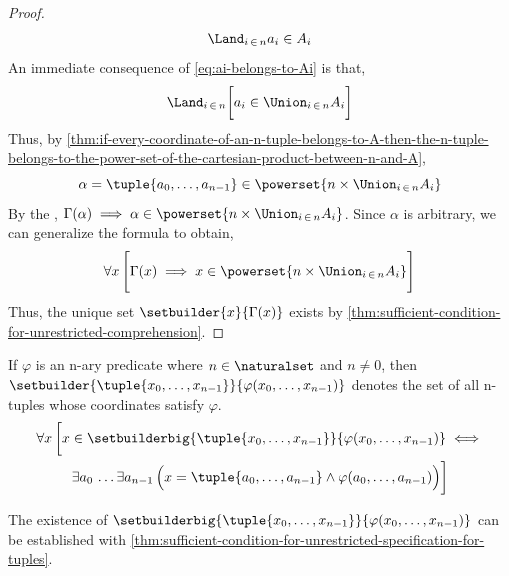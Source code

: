 \begin{proof}
    \begin{equation}
        \label{eq:ai-belongs-to-Ai}
        \Land_{i \,\in\, n} a_{i} \in A_{i}
    \end{equation}
    An immediate consequence of \eqref{eq:ai-belongs-to-Ai} is that,
    \begin{equation*}
        \Land_{i \,\in\, n} \bigg[a_{i} \in \Union_{i \,\in\, n} A_{i}\bigg]
    \end{equation*}
    Thus, by \cref{thm:if-every-coordinate-of-an-n-tuple-belongs-to-A-then-the-n-tuple-belongs-to-the-power-set-of-the-cartesian-product-between-n-and-A},
    \begin{equation*}
        \alpha = \tuple{a_{0}, \dots, a_{n-1}} \in \powerset{n \times \Union_{i \,\in\, n} A_{i}}
    \end{equation*}
    By the , \( \Gamma(\alpha) \implies \alpha \in \powerset{n \times \Union_{i \,\in\, n} A_{i}} \). Since \( \alpha \) is arbitrary,
    we can generalize the formula to obtain,
    \begin{equation*}
        \forall x \, \Bigg[ \Gamma(x) \implies x \in \powerset{n \times \Union_{i \,\in\, n} A_{i}} \Bigg]
    \end{equation*}
    Thus, the unique set \( \setbuilder{x}{\Gamma(x)} \) exists by \cref{thm:sufficient-condition-for-unrestricted-comprehension}.
\end{proof}

\begin{dfn}
    \label{dfn:set-builder-notation-for-tuples}
    If \( \varphi \) is an n-ary predicate where \( n \in \naturalset \) and \( n \neq 0 \),
    then \( \setbuilder{\tuple{x_{0}, \dots, x_{n-1}}}{\varphi(x_{0},\dots,x_{n-1})} \)
    denotes the set of all n-tuples whose coordinates satisfy \( \varphi \).
    \begin{multline*}
        \forall x \, \bigg[ x \in \setbuilderbig{\tuple{x_{0}, \dots, x_{n-1}}}{\varphi(x_{0},\dots,x_{n-1})} \iff \\
        \exists a_{0} \, \dots \exists a_{n-1} \, \Big( x = \tuple{a_{0}, \dots, a_{n-1}} \land \varphi(a_{0},\dots,a_{n-1}) \Big)
        \bigg]
    \end{multline*}
\end{dfn}

\begin{rem}
    The existence of \( \setbuilderbig{\tuple{x_{0}, \dots, x_{n-1}}}{\varphi(x_{0},\dots,x_{n-1})} \)
    can be established with \cref{thm:sufficient-condition-for-unrestricted-specification-for-tuples}.
\end{rem}

